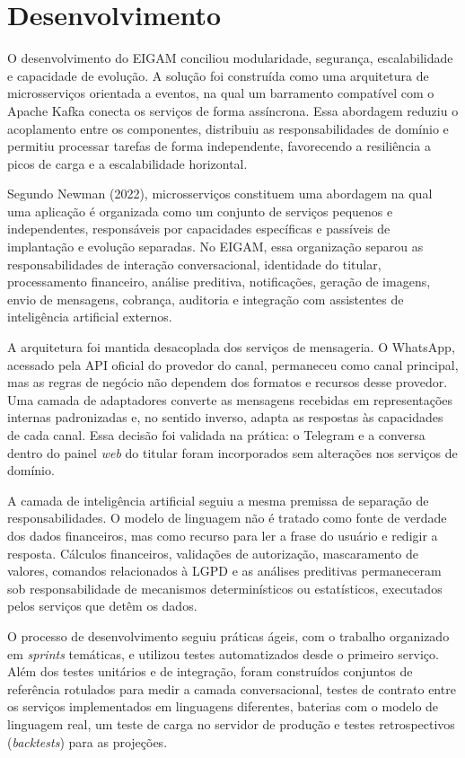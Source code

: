 \chapter{Desenvolvimento}\label{chap:desenvolvimento}

O desenvolvimento do EIGAM conciliou modularidade, segurança, escalabilidade e capacidade de evolução. A solução foi construída como uma arquitetura de microsserviços orientada a eventos, na qual um barramento compatível com o Apache Kafka conecta os serviços de forma assíncrona. Essa abordagem reduziu o acoplamento entre os componentes, distribuiu as responsabilidades de domínio e permitiu processar tarefas de forma independente, favorecendo a resiliência a picos de carga e a escalabilidade horizontal.

Segundo Newman (2022), microsserviços constituem uma abordagem na qual uma aplicação é organizada como um conjunto de serviços pequenos e independentes, responsáveis por capacidades específicas e passíveis de implantação e evolução separadas. No EIGAM, essa organização separou as responsabilidades de interação conversacional, identidade do titular, processamento financeiro, análise preditiva, notificações, geração de imagens, envio de mensagens, cobrança, auditoria e integração com assistentes de inteligência artificial externos.

A arquitetura foi mantida desacoplada dos serviços de mensageria. O WhatsApp, acessado pela API oficial do provedor do canal, permaneceu como canal principal, mas as regras de negócio não dependem dos formatos e recursos desse provedor. Uma camada de adaptadores converte as mensagens recebidas em representações internas padronizadas e, no sentido inverso, adapta as respostas às capacidades de cada canal. Essa decisão foi validada na prática: o Telegram e a conversa dentro do painel \textit{web} do titular foram incorporados sem alterações nos serviços de domínio.

A camada de inteligência artificial seguiu a mesma premissa de separação de responsabilidades. O modelo de linguagem não é tratado como fonte de verdade dos dados financeiros, mas como recurso para ler a frase do usuário e redigir a resposta. Cálculos financeiros, validações de autorização, mascaramento de valores, comandos relacionados à LGPD e as análises preditivas permaneceram sob responsabilidade de mecanismos determinísticos ou estatísticos, executados pelos serviços que detêm os dados.

O processo de desenvolvimento seguiu práticas ágeis, com o trabalho organizado em \textit{sprints} temáticas, e utilizou testes automatizados desde o primeiro serviço. Além dos testes unitários e de integração, foram construídos conjuntos de referência rotulados para medir a camada conversacional, testes de contrato entre os serviços implementados em linguagens diferentes, baterias com o modelo de linguagem real, um teste de carga no servidor de produção e testes retrospectivos (\textit{backtests}) para as projeções.

